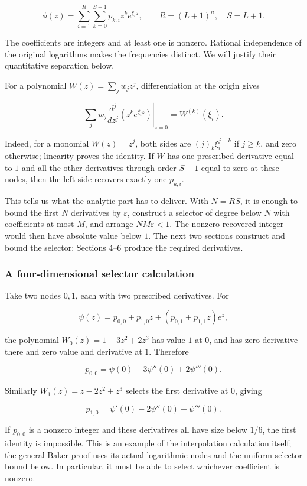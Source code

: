 \documentclass[
  11pt,
  a4paper,
]{article}
\begin{document}
\[
\phi(z)=\sum_{i=1}^{R}\sum_{k=0}^{S-1}p_{k,i}z^ke^{\xi_i z},
\qquad R=(L+1)^n,\quad S=L+1.
\]

The coefficients are integers and at least one is nonzero. Rational
independence of the original logarithms makes the frequencies distinct.
We will justify their quantitative separation below.

For a polynomial \(W(z)=\sum_jw_jz^j\), differentiation at the origin
gives

\[
\sum_jw_j\left.\frac{d^j}{dz^j}(z^ke^{\xi_i z})\right|_{z=0}
=W^{(k)}(\xi_i).
\]

Indeed, for a monomial \(W(z)=z^j\), both sides are \((j)_k\xi_i^{j-k}\)
if \(j\ge k\), and zero otherwise; linearity proves the identity. If
\(W\) has one prescribed derivative equal to \(1\) and all the other
derivatives through order \(S-1\) equal to zero at these nodes, then the
left side recovers exactly one \(p_{k,i}\).

This tells us what the analytic part has to deliver. With \(N=RS\), it
is enough to bound the first \(N\) derivatives by \(\varepsilon\),
construct a selector of degree below \(N\) with coefficients at most
\(M\), and arrange \(NM\varepsilon<1\). The nonzero recovered integer
would then have absolute value below \(1\). The next two sections
construct and bound the selector; Sections 4--6 produce the required
derivatives.

\subsubsection{A four-dimensional selector
calculation}\label{a-four-dimensional-selector-calculation}

Take two nodes \(0,1\), each with two prescribed derivatives. For

\[
\psi(z)=p_{0,0}+p_{1,0}z+(p_{0,1}+p_{1,1}z)e^z,
\]

the polynomial \(W_0(z)=1-3z^2+2z^3\) has value \(1\) at \(0\), and has
zero derivative there and zero value and derivative at \(1\). Therefore

\[
p_{0,0}=\psi(0)-3\psi''(0)+2\psi'''(0).
\]

Similarly \(W_1(z)=z-2z^2+z^3\) selects the first derivative at \(0\),
giving

\[
p_{1,0}=\psi'(0)-2\psi''(0)+\psi'''(0).
\]

If \(p_{0,0}\) is a nonzero integer and these derivatives all have size
below \(1/6\), the first identity is impossible. This is an example of
the interpolation calculation itself; the general Baker proof uses its
actual logarithmic nodes and the uniform selector bound below. In
particular, it must be able to select whichever coefficient is nonzero.
\end{document}
